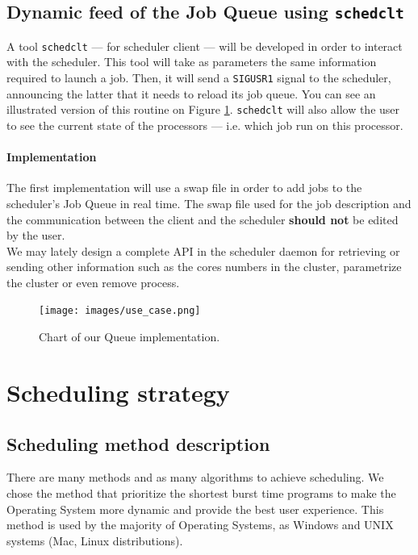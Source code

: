 \documentclass[a4paper,11pt]{article}
\begin{document}
\subsection{Dynamic feed of the Job Queue using \texttt{schedclt}}\label{schedclt_implementation}

A tool \texttt{schedclt} --- for scheduler client --- will be developed in order to interact with the scheduler. This tool will take as parameters the same information required to launch a job. Then, it will send a \texttt{SIGUSR1} signal to the scheduler, announcing the latter that it needs to reload its job queue. You can see an illustrated version of this routine on Figure \ref{schedclt_implementation_png}. \texttt{schedclt} will also allow the user to see the current state of the processors --- i.e. which job run on this processor.

\paragraph{Implementation}
The first implementation will use a swap file in order to add jobs to the scheduler's Job Queue in real time. The swap file used for the job description and the communication between the client and the scheduler \textbf{should not} be edited by the user.\\
We may lately design a complete API in the scheduler daemon for retrieving or sending other information such as the cores numbers in the cluster, parametrize the cluster or even remove process.

\begin{center}
\begin{figure}[ht]
\texttt{[image: images/use\_case.png]}
\caption{Chart of our Queue implementation.}
\label{schedclt_implementation_png}
\end{figure}
\end{center}

\clearpage

\section{Scheduling strategy}\label{scheduling_strategy}

\subsection{Scheduling method description}

There are many methods and as many algorithms to achieve scheduling. We chose the method that prioritize the shortest burst time programs to make the Operating System more dynamic and provide the best user experience.
This method is used by the majority of Operating Systems, as Windows and UNIX systems (Mac, Linux distributions).
\end{document}
